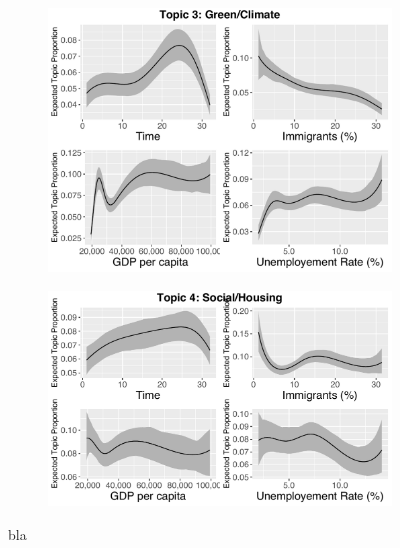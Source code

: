 \begin{figure}[h!]
  \centering
  \begin{subfigure}[b]{0.4\linewidth}
    \includegraphics[width=\linewidth]{../plots/appendix/4_4/beta_t3_cont.pdf}
  \end{subfigure}
  \begin{subfigure}[b]{0.4\linewidth}
    \includegraphics[width=\linewidth]{../plots/appendix/4_4/beta_t4_cont.pdf}
  \end{subfigure}
  \caption{bla}
  \label{fig:coffee}
\end{figure}

